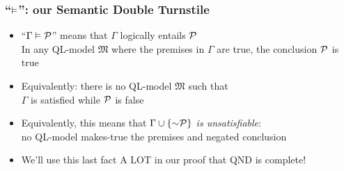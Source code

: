 \begin{frame}
\frametitle{``$\vDash$'': our Semantic Double Turnstile}

\begin{itemize}[<+->]


\item ``$\Gamma \vDash \mathcal{P}$'' means that $\Gamma$ logically entails $\mathcal{P}$ \\ In any QL-model $\mathfrak{M}$ where the premises in $\Gamma$ are true, the conclusion $\mathcal{P}$ is true 

\item Equivalently: there is no QL-model $\mathfrak{M}$ such that \\ $\Gamma$ is satisfied while $\mathcal{P}$ is false

\item Equivalently, this means that \emph{$\Gamma \cup \{\enot \metav{P}\}$ is unsatisfiable}: \\ no QL-model makes-true the premises and negated conclusion  

\item We'll use this last fact A LOT in our proof that QND is complete! %

\end{itemize}
\end{frame}


